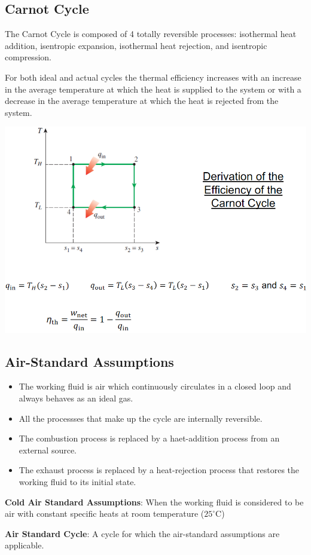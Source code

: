 \documentclass{article}
\begin{document}
\begin{multicols}{3}
    \subsection*{Carnot Cycle}
    The Carnot Cycle is composed of 4 totally reversible processes: isothermal heat addition, isentropic expansion, isothermal heat rejection, and isentropic compression.\par 
    For both ideal and actual cycles the thermal efficiency increases with an increase in the average temperature at which the heat is supplied to the system or with a decrease in the average temperature at which the heat is rejected from the system.\par 
    \includegraphics[width=\linewidth]{Images/Carnot_Cucle.png}
    \subsection*{Air-Standard Assumptions}
    \begin{itemize}
        \item The working fluid is air which continuously circulates in a closed loop and always behaves as an ideal gas.
        \item All the processses that make up the cycle are internally reversible.
        \item The combustion process is replaced by a haet-addition process from an external source.
        \item The exhaust process is replaced by a heat-rejection process that restores the working fluid to its initial state.
    \end{itemize}
    \textbf{Cold Air Standard Assumptions}: When the working fluid is considered to be air with constant specific heats at room temperature ($25^\circ$C)\par 
    \textbf{Air Standard Cycle}: A cycle for which the air-standard assumptions are applicable.

\end{multicols}
\end{document}
